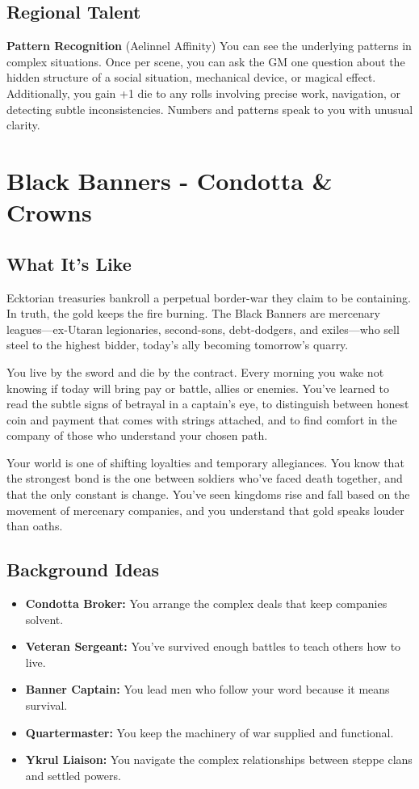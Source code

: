 \documentclass[11pt]{article}
\newcommand{\region}[1]{\section*{#1}}
\newcommand{\subregion}[1]{\subsection*{#1}}
\begin{document}
\begin{multicols}{2}
\subregion{Regional Talent}

\textbf{Pattern Recognition} (Aelinnel Affinity)
You can see the underlying patterns in complex situations. Once per scene, you can ask the GM one question about the hidden structure of a social situation, mechanical device, or magical effect. Additionally, you gain +1 die to any rolls involving precise work, navigation, or detecting subtle inconsistencies. Numbers and patterns speak to you with unusual clarity.

\end{multicols}

\region{Black Banners - Condotta \& Crowns}

\begin{multicols}{2}
\subregion{What It's Like}

Ecktorian treasuries bankroll a perpetual border-war they claim to be containing. In truth, the gold keeps the fire burning. The Black Banners are mercenary leagues—ex-Utaran legionaries, second-sons, debt-dodgers, and exiles—who sell steel to the highest bidder, today's ally becoming tomorrow's quarry.

You live by the sword and die by the contract. Every morning you wake not knowing if today will bring pay or battle, allies or enemies. You've learned to read the subtle signs of betrayal in a captain's eye, to distinguish between honest coin and payment that comes with strings attached, and to find comfort in the company of those who understand your chosen path.

Your world is one of shifting loyalties and temporary allegiances. You know that the strongest bond is the one between soldiers who've faced death together, and that the only constant is change. You've seen kingdoms rise and fall based on the movement of mercenary companies, and you understand that gold speaks louder than oaths.

\columnbreak

\subregion{Background Ideas}

\begin{itemize}[leftmargin=*]
    \item \textbf{Condotta Broker:} You arrange the complex deals that keep companies solvent.
    \item \textbf{Veteran Sergeant:} You've survived enough battles to teach others how to live.
    \item \textbf{Banner Captain:} You lead men who follow your word because it means survival.
    \item \textbf{Quartermaster:} You keep the machinery of war supplied and functional.
    \item \textbf{Ykrul Liaison:} You navigate the complex relationships between steppe clans and settled powers.
\end{itemize}


\end{multicols}
\end{document}
